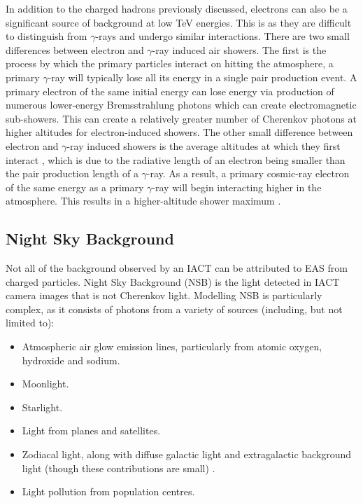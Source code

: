 In addition to the charged hadrons previously discussed, electrons can also be a significant source of background at low TeV energies. This is as they are difficult to distinguish from $\gamma$-rays and undergo similar interactions. There are two small differences between electron and $\gamma$-ray induced air showers. The first is the process by which the primary particles interact on hitting the atmosphere, a primary $\gamma$-ray will typically lose all its energy in a single pair production event. A primary electron of the same initial energy can lose energy via production of numerous lower-energy Bremsstrahlung photons which can create electromagnetic sub-showers. This can create a relatively greater number of Cherenkov photons at higher altitudes for electron-induced showers. The other small difference between electron and $\gamma$-ray induced showers is the average altitudes at which they first interact \cite{Sitarek1i}, which is due to the radiative length of an electron being smaller than the pair production length of a $\gamma$-ray. As a result, a primary cosmic-ray electron of the same energy as a primary $\gamma$-ray will begin interacting higher in the atmosphere. This results in a higher-altitude shower maximum \cite{lypova}. 

\subsection{Night Sky Background}
Not all of the background observed by an IACT can be attributed to EAS from charged particles. Night Sky Background (NSB) is the light detected in IACT camera images that is not Cherenkov light. Modelling NSB is particularly complex, as it consists of photons from a variety of sources (including, but not limited to):

\begin{itemize}
    \item Atmospheric air glow emission lines, particularly from atomic oxygen, hydroxide and sodium.
    \item Moonlight.
    \item Starlight.
    \item Light from planes and satellites.
    \item Zodiacal light, along with diffuse galactic light and extragalactic background light (though these contributions are small) \cite{nsbref}.
    \item Light pollution from population centres.
\end{itemize}

